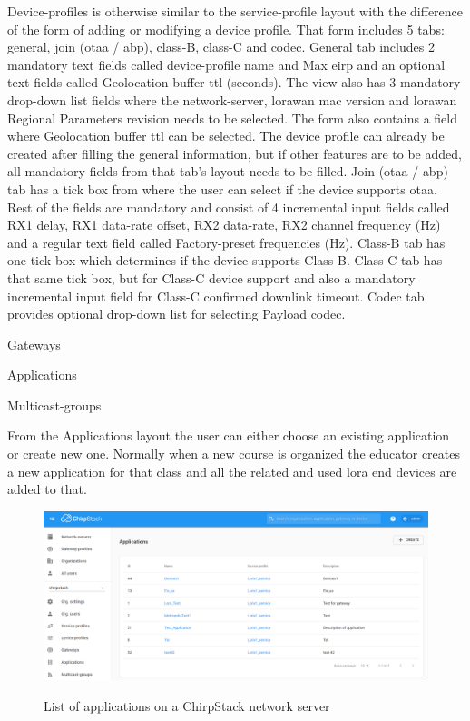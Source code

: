 Device-profiles is otherwise similar to the service-profile layout with the difference of the form of adding or modifying a device profile.
That form includes 5 tabs: general, join (\gls{otaa} / \gls{abp}), class-B, class-C and codec.
General tab includes 2 mandatory text fields called device-profile name and Max \gls{eirp} and an optional text fields called Geolocation buffer \gls{ttl} (seconds). The view also has 3 mandatory drop-down list fields where the network-server, \gls{lorawan} \gls{mac} version and \gls{lorawan} Regional Parameters revision needs to be selected.
The form also contains a field where Geolocation buffer \gls{ttl} can be selected.
The device profile can already be created after filling the general information, but if other features are to be added, all mandatory fields from that tab's layout needs to be filled.
Join (\gls{otaa} / \gls{abp}) tab has a tick box from where the user can select if the device supports \gls{otaa}.
Rest of the fields are mandatory and consist of 4 incremental input fields called RX1 delay, RX1 data-rate offset, RX2 data-rate, RX2 channel frequency (Hz) and a regular text field called Factory-preset frequencies (Hz).
Class-B tab has one tick box which determines if the device supports Class-B.
Class-C tab  has that same tick box, but for Class-C device support and also a mandatory incremental input field for Class-C confirmed downlink timeout.
Codec tab provides optional drop-down list for selecting Payload codec.

Gateways

Applications

Multicast-groups

From the Applications layout the user can either choose an existing application or create new one.
Normally when a new course is organized the educator creates a new application for that class and all the related and used \gls{lora} end devices are added to that.

\begin{figure}[ht]
  \centering
  {\includegraphics[width=\textwidth]{illustration/ChirpStack_application_list.png}}
  \caption{List of applications on a ChirpStack network server}
  \label{fig:ChirpStack_application_list}
\end{figure}

